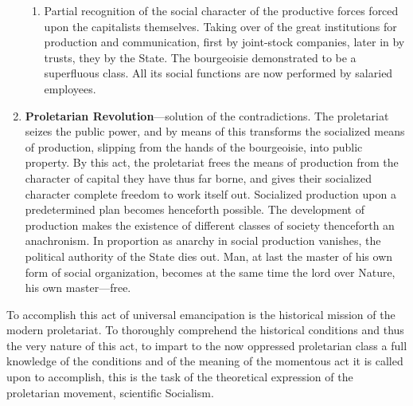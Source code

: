\begin{enumerate}[label=\textbf{\arabic*.}]
{\begin{enumerate}
{{         reserve-army.} On the other hand, unlimited extension of production,
         also compulsory under competition, for every manufacturer. On both
         sides, unheard-of development of productive forces, excess of supply
         over demand, over-production and products---excess there, of labourers,
         without employment and without means of existence. But these two levers
         of production and of social well-being are unable to work together,
         because the capitalist form of production prevents the productive
         forces from working and the products from circulating, unless they are
         first turned into capital---which their very superabundance prevents.
         The contradiction has grown into an absurdity. \emph{The mode of
         production rises in rebellion against the form of exchange.}
       }
       \item{
         Partial recognition of the social character of the productive forces
         forced upon the capitalists themselves. Taking over of the great
         institutions for production and communication, first by joint-stock
         companies, later in by trusts, they by the State. The bourgeoisie
         demonstrated to be a superfluous class. All its social functions are
         now performed by salaried employees.
       }
    \end{enumerate}
  }
  \item{
    \textbf{Proletarian Revolution}---solution of the contradictions. The
    proletariat seizes the public power, and by means of this transforms the
    socialized means of production, slipping from the hands of the bourgeoisie,
    into public property. By this act, the proletariat frees the means of
    production from the character of capital they have thus far borne, and gives
    their socialized character complete freedom to work itself out. Socialized
    production upon a predetermined plan becomes henceforth possible. The
    development of production makes the existence of different classes of
    society thenceforth an anachronism. In proportion as anarchy in social
    production vanishes, the political authority of the State dies out. Man, at
    last the master of his own form of social organization, becomes at the same
    time the lord over Nature, his own master---free.
  }
\end{enumerate}

To accomplish this act of universal emancipation is the historical mission of
the modern proletariat. To thoroughly comprehend the historical conditions and
thus the very nature of this act, to impart to the now oppressed proletarian
class a full knowledge of the conditions and of the meaning of the momentous act
it is called upon to accomplish, this is the task of the theoretical expression
of the proletarian movement, scientific Socialism.

\printendnotes
